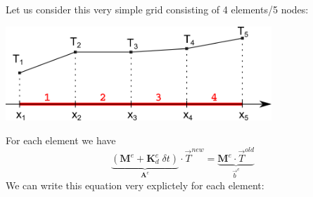 Let us consider this very simple grid consisting of 4 elements/5 nodes:
\begin{center}
\includegraphics[width=10cm]{images/oneD/grid5}
\end{center}
For each element we have 
\[
\underbrace{( {\bm M}^e +  {\bm K}_d^e \; \delta t )}_{\bm A^{e}} \cdot {\vec T}^{new} =  \underbrace{{\bm M}^e \cdot  {\vec T}^{old} }_{\vec b^{e}}
\]
We can write this equation very explictely for each element:
